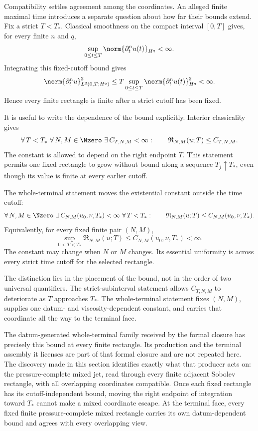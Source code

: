 Compatibility settles agreement among the coordinates.
An alleged finite maximal time introduces a separate question about how far their bounds extend.
Fix a strict \(T<T_*\).
Classical smoothness on the compact interval \([0,T]\) gives, for every finite \(n\) and \(q\),
\[
  \sup_{0\leq t\leq T}
  \norm{\partial_t^n u(t)}_{H^q}
  <\infty.
\]
Integrating this fixed-cutoff bound gives
\[
  \norm{\partial_t^n u}_{L^2(0,T;H^q)}^2
  \leq
  T
  \sup_{0\leq t\leq T}
  \norm{\partial_t^n u(t)}_{H^q}^2
  <\infty.
\]
Hence every finite rectangle is finite after a strict cutoff has been fixed.

It is useful to write the dependence of the bound explicitly.
Interior classicality gives
\[
  \forall\,T<T_*
  \ \forall\,N,M\in\Nzero
  \ \exists\,C_{T,N,M}<\infty:
  \qquad
  \mathfrak R_{N,M}(u;T)
  \leq
  C_{T,N,M}.
\]
The constant is allowed to depend on the right endpoint \(T\).
This statement permits one fixed rectangle to grow without bound along a sequence \(T_j\uparrow T_*\), even though its value is finite at every earlier cutoff.

The whole-terminal statement moves the existential constant outside the time cutoff:
\[
  \forall\,N,M\in\Nzero
  \ \exists\,C_{N,M}(u_0,\nu,T_*)<\infty
  \ \forall\,T<T_*:
  \qquad
  \mathfrak R_{N,M}(u;T)
  \leq
  C_{N,M}(u_0,\nu,T_*).
\]
Equivalently, for every fixed finite pair \((N,M)\),
\[
  \sup_{0<T<T_*}
  \mathfrak R_{N,M}(u;T)
  \leq
  C_{N,M}(u_0,\nu,T_*)
  <\infty.
\]
The constant may change when \(N\) or \(M\) changes.
Its essential uniformity is across every strict time cutoff for the selected rectangle.

The distinction lies in the placement of the bound, not in the order of two universal quantifiers.
The strict-subinterval statement allows \(C_{T,N,M}\) to deteriorate as \(T\) approaches \(T_*\).
The whole-terminal statement fixes \((N,M)\), supplies one datum- and viscosity-dependent constant, and carries that coordinate all the way to the terminal face.

The datum-generated whole-terminal family received by the formal closure has precisely this bound at every finite rectangle.
Its production and the terminal assembly it licenses are part of that formal closure and are not repeated here.
The discovery made in this section identifies exactly what that producer acts on: the pressure-complete mixed jet, read through every finite adjacent Sobolev rectangle, with all overlapping coordinates compatible.
Once each fixed rectangle has its cutoff-independent bound, moving the right endpoint of integration toward \(T_*\) cannot make a mixed coordinate escape.
At the terminal face, every fixed finite pressure-complete mixed rectangle carries its own datum-dependent bound and agrees with every overlapping view.
